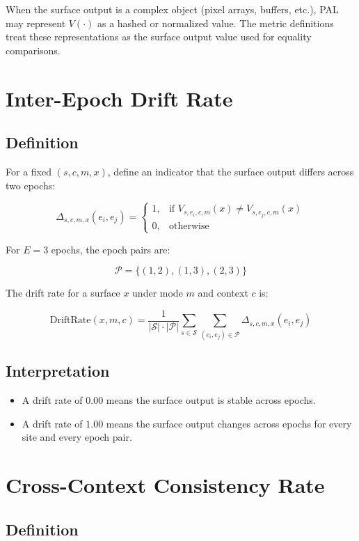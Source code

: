 \documentclass[11pt]{report}
\begin{document}
When the surface output is a complex object (pixel arrays, buffers, etc.), PAL may represent $V(\cdot)$ as a hashed or normalized value. The metric definitions treat these representations as the surface output value used for equality comparisons.

\section{Inter-Epoch Drift Rate}

\subsection{Definition}

For a fixed $(s,c,m,x)$, define an indicator that the surface output differs across two epochs:

\[
\Delta_{s,c,m,x}(e_i,e_j) =
\begin{cases}
1, & \text{if } V_{s,e_i,c,m}(x) \neq V_{s,e_j,c,m}(x) \\
0, & \text{otherwise}
\end{cases}
\]

For $E=3$ epochs, the epoch pairs are:

\[
\mathcal{P} = \{(1,2), (1,3), (2,3)\}
\]

The drift rate for a surface $x$ under mode $m$ and context $c$ is:

\[
\text{DriftRate}(x,m,c) =
\frac{1}{|\mathcal{S}| \cdot |\mathcal{P}|}
\sum_{s \in \mathcal{S}} \sum_{(e_i,e_j)\in\mathcal{P}}
\Delta_{s,c,m,x}(e_i,e_j)
\]

\subsection{Interpretation}

\begin{itemize}
    \item A drift rate of $0.00$ means the surface output is stable across epochs.
    \item A drift rate of $1.00$ means the surface output changes across epochs for every site and every epoch pair.
\end{itemize}

\section{Cross-Context Consistency Rate}

\subsection{Definition}
\end{document}
